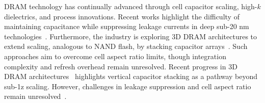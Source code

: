 DRAM technology has continually advanced through cell capacitor scaling, high-$k$ dielectrics, and process innovations. 
Recent works highlight the difficulty of maintaining capacitance while suppressing leakage currents in deep sub-20 nm technologies~\cite{choi2022}. 
Furthermore, the industry is exploring 3D DRAM architectures to extend scaling, analogous to NAND flash, by stacking capacitor arrays~\cite{kim2021_dram, iedm2023_dram}. 
Such approaches aim to overcome cell aspect ratio limits, though integration complexity and refresh overhead remain unresolved.
Recent progress in 3D DRAM architectures~\cite{kim2021_dram, iedm2023_dram} highlights vertical capacitor stacking 
as a pathway beyond sub-1z scaling. 
However, challenges in leakage suppression and cell aspect ratio remain unresolved~\cite{lee2020_dram}.
